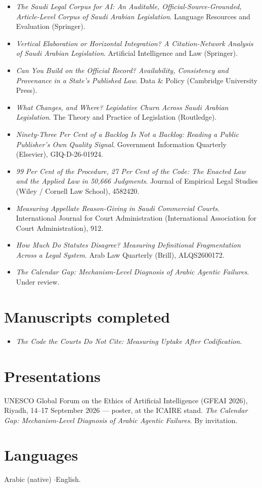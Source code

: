 \documentclass[11pt]{article}
\begin{document}
\begin{itemize}
\item \emph{The Saudi Legal Corpus for AI: An Auditable,
      Official-Source-Grounded, Article-Level Corpus of Saudi Arabian
      Legislation}. Language Resources and Evaluation (Springer).
\item \emph{Vertical Elaboration or Horizontal Integration? A
      Citation-Network Analysis of Saudi Arabian Legislation}. Artificial
      Intelligence and Law (Springer).
\item \emph{Can You Build on the Official Record? Availability, Consistency
      and Provenance in a State's Published Law}. Data \& Policy (Cambridge
      University Press).
\item \emph{What Changes, and Where? Legislative Churn Across Saudi Arabian
      Legislation}. The Theory and Practice of Legislation (Routledge).
\item \emph{Ninety-Three Per Cent of a Backlog Is Not a Backlog: Reading a
      Public Publisher's Own Quality Signal}. Government Information Quarterly
      (Elsevier), GIQ-D-26-01924.
\item \emph{99 Per Cent of the Procedure, 27 Per Cent of the Code: The
      Enacted Law and the Applied Law in 50,666 Judgments}. Journal of
      Empirical Legal Studies (Wiley / Cornell Law School), 4582420.
\item \emph{Measuring Appellate Reason-Giving in Saudi Commercial Courts}.
      International Journal for Court Administration (International
      Association for Court Administration), 912.
\item \emph{How Much Do Statutes Disagree? Measuring Definitional
      Fragmentation Across a Legal System}. Arab Law Quarterly (Brill),
      ALQS2600172.
\item \emph{The Calendar Gap: Mechanism-Level Diagnosis of Arabic Agentic
      Failures}. Under review.
\end{itemize}

\section{Manuscripts completed}

\begin{itemize}
\item \emph{The Code the Courts Do Not Cite: Measuring Uptake After
      Codification}.
\end{itemize}

\section{Presentations}

UNESCO Global Forum on the Ethics of Artificial Intelligence (GFEAI 2026),
Riyadh, 14--17 September 2026 --- poster, at the ICAIRE stand. \emph{The
Calendar Gap: Mechanism-Level Diagnosis of Arabic Agentic Failures}. By
invitation.

\section{Languages}

Arabic (native) \quad$\cdot$\quad English.
\end{document}
